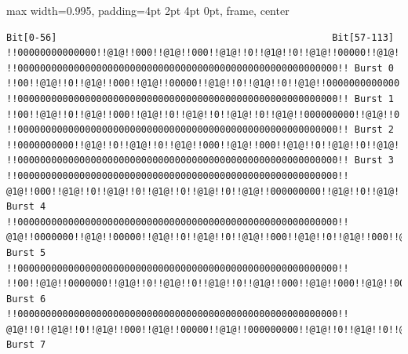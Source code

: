 \begin{samepage}
\begin{adjustbox}{max width={0.995\textwidth}, padding=4pt 2pt 4pt 0pt, frame, center}
\begin{lstlisting}[language=bytetxt, numbers=none]
Bit[0-56]                                                 Bit[57-113]
!!00000000000000!!@1@!!000!!@1@!!000!!@1@!!0!!@1@!!0!!@1@!!00000!!@1@!!00000!!@1@!!0!!@1@!!0!!@1@!!0!!@1@!!000!!@1@!!000!!@1@!!000!!@1@ !!000000000000000000000000000000000000000000000000000000000!! Burst 0
!!00!!@1@!!0!!@1@!!000!!@1@!!00000!!@1@!!0!!@1@!!0!!@1@!!0000000000000!!@1@!!0!!@1@!!0!!@1@!!000!!@1@!!000!!@1@!!0!!@1@!!0!!@1@!!000!!@1@!!0!!@1@!!00!! !!000000000000000000000000000000000000000000000000000000000!! Burst 1
!!00!!@1@!!0!!@1@!!000!!@1@!!0!!@1@!!0!!@1@!!0!!@1@!!000000000!!@1@!!0!!@1@!!0!!@1@!!00000000000!!@1@!!0!!@1@!!000000000!!@1@!!000!!@1@ !!000000000000000000000000000000000000000000000000000000000!! Burst 2
!!0000000000!!@1@!!0!!@1@!!0!!@1@!!000!!@1@!!000!!@1@!!0!!@1@!!0!!@1@!!0000000000000!!@1@!!0!!@1@!!0!!@1@!!0!!@1@!!0!!@1@!!00000000!! !!000000000000000000000000000000000000000000000000000000000!! Burst 3
!!000000000000000000000000000000000000000000000000000000000!! @1@!!000!!@1@!!0!!@1@!!0!!@1@!!0!!@1@!!0!!@1@!!000000000!!@1@!!0!!@1@!!0!!@1@!!0!!@1@!!000!!@1@!!000!!@1@!!0!!@1@!!00000!!@1@!!000000000000!! Burst 4
!!000000000000000000000000000000000000000000000000000000000!! @1@!!0000000!!@1@!!00000!!@1@!!0!!@1@!!0!!@1@!!000!!@1@!!0!!@1@!!000!!@1@!!00000!!@1@!!0!!@1@!!00000!!@1@!!0!!@1@!!0!!@1@!!000!!@1@!!0!!@1@!!0000!! Burst 5
!!000000000000000000000000000000000000000000000000000000000!! !!00!!@1@!!0000000!!@1@!!0!!@1@!!0!!@1@!!0!!@1@!!000!!@1@!!000!!@1@!!00000!!@1@!!0!!@1@!!0000000!!@1@!!0!!@1@!!0!!@1@!!000!!@1@!!0!!@1@!!000000!! Burst 6
!!000000000000000000000000000000000000000000000000000000000!! @1@!!0!!@1@!!0!!@1@!!000!!@1@!!00000!!@1@!!000000000!!@1@!!0!!@1@!!0!!@1@!!00000!!@1@!!0000000!!@1@!!0!!@1@!!0!!@1@!!0!!@1@!!0!!@1@!!000!!@1@!!00!! Burst 7
\end{lstlisting}
\end{adjustbox}
\begin{lstlisting}[caption={[Verschachtlung von Testdaten mit block-diagonalem Interleaving]Verschachtlung von Testdaten mit block-diagonalem Interleaving, Datensatz generiert mit \texttt{dummycoder} (siehe \autoref{hdl:coder-impl})}, basicstyle=\tiny, label=lst:interl-block-diag]
\end{lstlisting}
\end{samepage}

